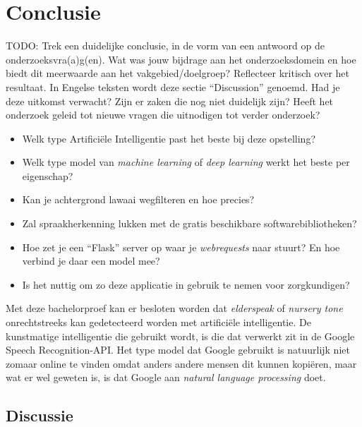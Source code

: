 
\chapter{Conclusie}
\label{ch:conclusie}



\color{blue}
TODO: Trek een duidelijke conclusie, in de vorm van een antwoord op de
 onderzoeksvra(a)g(en). Wat was jouw bijdrage aan het onderzoeksdomein en
 hoe biedt dit meerwaarde aan het vakgebied/doelgroep?
 Reflecteer kritisch over het resultaat. In Engelse teksten wordt deze sectie
 ``Discussion'' genoemd. Had je deze uitkomst verwacht? Zijn er zaken die nog
 niet duidelijk zijn?
 Heeft het onderzoek geleid tot nieuwe vragen die uitnodigen tot verder
onderzoek?


\begin{itemize}
    \item Welk type Artificiële Intelligentie past het beste bij deze opstelling?
    \item Welk type model van \textit{machine learning} of \textit{deep learning} werkt het beste per eigenschap?
    \item Kan je achtergrond lawaai wegfilteren en hoe precies?
    \item Zal spraakherkenning lukken met de gratis beschikbare softwarebibliotheken?
    \item Hoe zet je een ``Flask'' server op waar je \textit{webrequests} naar stuurt? En hoe verbind je daar een model mee?
    \item Is het nuttig om zo deze applicatie in gebruik te nemen voor zorgkundigen?
\end{itemize}

\color{black}

Met deze bachelorproef kan er besloten worden dat \textit{elderspeak} of \textit{nursery tone} onrechtstreeks kan gedetecteerd worden met artificiële intelligentie. De kunstmatige intelligentie die gebruikt wordt, is die dat verwerkt zit in de Google Speech Recognition-API.
Het type model dat Google gebruikt is natuurlijk niet zomaar online te vinden omdat anders andere mensen dit kunnen kopiëren, maar wat er wel geweten is, is dat Google aan \textit{natural language processing} doet.


\section{Discussie}


